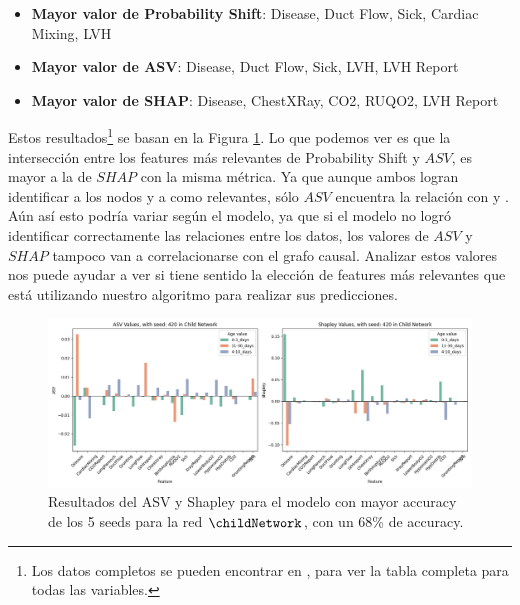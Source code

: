 \begin{itemize}
    \item \textbf{Mayor valor de Probability Shift}: Disease, Duct Flow, Sick, Cardiac Mixing, LVH
    \item \textbf{Mayor valor de ASV}: Disease, Duct Flow, Sick, LVH, LVH Report
    \item \textbf{Mayor valor de SHAP}: Disease, ChestXRay, CO2, RUQO2, LVH Report
\end{itemize}

Estos resultados\footnote{Los datos completos se pueden encontrar en , para ver la tabla completa para todas las variables.} se basan en la Figura \ref{fig:shapleyVsASVSingleSeedChild}. Lo que podemos ver es que la intersección entre los features más relevantes de Probability Shift y $ASV$, es mayor a la de $SHAP$ con la misma métrica. Ya que aunque ambos logran identificar a los nodos  y a  como relevantes, sólo $ASV$ encuentra la relación con  y . Aún así esto podría variar según el modelo, ya que si el modelo no logró identificar correctamente las relaciones entre los datos, los valores de $ASV$ y $SHAP$ tampoco van a correlacionarse con el grafo causal. Analizar estos valores nos puede ayudar a ver si tiene sentido la elección de features más relevantes que está utilizando nuestro algoritmo para realizar sus predicciones. 

\begin{figure}
    \centering
    \includegraphics[width=1\linewidth]{img/asvResults/childASVAndShapleyExactASVAndShapley.png}
    \caption{Resultados del ASV y Shapley para el modelo con mayor accuracy de los 5 seeds para la red $\childNetwork$, con un 68\% de accuracy. }
    \label{fig:shapleyVsASVSingleSeedChild}
\end{figure}

